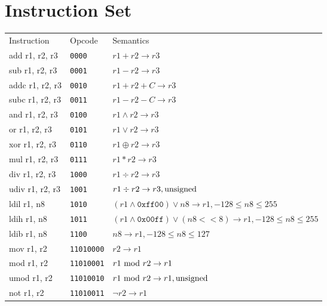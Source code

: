 \documentclass[10pt, twoside, a4paper]{article}
\newcommand{\shl}{\ensuremath{<\!\!<}}
\begin{document}
  \clearpage

  \section{Instruction Set}

  {\small
  \begin{longtable}{llp{}}
    Instruction       & Opcode                & Semantics \\
    add r1, r2, r3    & \texttt{0000}         & $r1 + r2 \rightarrow r3$ \\
    sub r1, r2, r3    & \texttt{0001}         & $r1 - r2 \rightarrow r3$ \\
    addc r1, r2, r3   & \texttt{0010}         & $r1 + r2 + C \rightarrow r3$ \\
    subc r1, r2, r3   & \texttt{0011}         & $r1 - r2 - C \rightarrow r3$ \\
    and r1, r2, r3    & \texttt{0100}         & $r1 \wedge r2 \rightarrow r3$ \\
    or r1, r2, r3     & \texttt{0101}         & $r1 \vee r2 \rightarrow r3$ \\
    xor r1, r2, r3    & \texttt{0110}         & $r1 \oplus r2 \rightarrow r3$ \\
    mul r1, r2, r3    & \texttt{0111}         & $r1 * r2 \rightarrow r3$ \\
    div r1, r2, r3    & \texttt{1000}         & $r1 \div r2 \rightarrow r3$ \\
    udiv r1, r2, r3   & \texttt{1001}         & $r1 \div r2 \rightarrow r3, \textnormal{unsigned} $ \\
    ldil r1, n8       & \texttt{1010}         & $(r1 \wedge \texttt{0xff00}) \vee n8 \rightarrow r1, -128 \leq n8 \leq 255 $ \\
    ldih r1, n8       & \texttt{1011}         & $(r1 \wedge \texttt{0x00ff}) \vee (n8 \shl 8) \rightarrow r1, -128 \leq n8 \leq 255 $ \\
    ldib r1, n8       & \texttt{1100}         & $n8 \rightarrow r1, -128 \leq n8 \leq 127$ \\
  \hline
    mov r1, r2        & \texttt{11010000}     & $r2 \rightarrow r1$ \\
    mod r1, r2        & \texttt{11010001}     & $r1\ \textnormal{mod}\ r2 \rightarrow r1$ \\
    umod r1, r2       & \texttt{11010010}     & $r1\ \textnormal{mod}\ r2 \rightarrow r1, \textnormal{unsigned} $ \\
    not r1, r2        & \texttt{11010011}     & $\lnot r2 \rightarrow r1$ \\

\end{longtable}}
\end{document}
